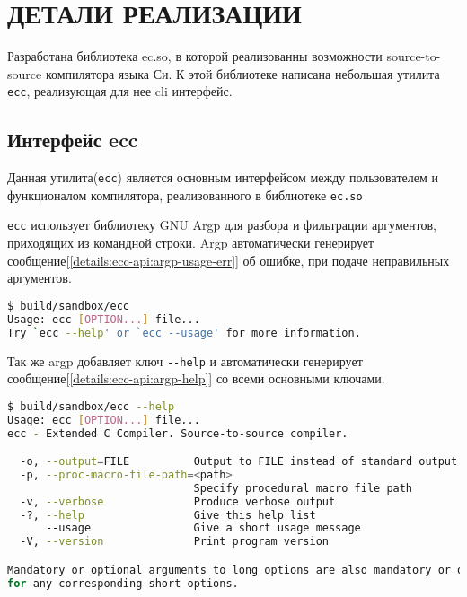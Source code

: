\chapter{ДЕТАЛИ РЕАЛИЗАЦИИ}
\label{ch:ch2}


Разработана библиотека ec.so, в которой реализованны возможности source-to-source компилятора языка Си.
К этой библиотеке написана небольшая утилита \verb|ecc|, реализующая для нее cli интерфейс.

\section{Интерфейс ecc}
\label{details:ecc-cli}
Данная утилита(\verb|ecc|) является основным интерфейсом между пользователем и функционалом компилятора, реализованного в библиотеке \verb|ec.so|

\verb|ecc| использует библиотеку GNU Argp\cite{gnu-argp} для разбора и фильтрации аргументов, приходящих из командной строки. 
Argp автоматически генерирует сообщение[\ref{details:ecc-api:argp-usage-err}] об ошибке, при подаче неправильных аргументов.

\begin{lstlisting}[language=bash, caption={Пример сообщения об ошике, сгенерированного argp}, label={details:ecc-api:argp-usage-err}]
$ build/sandbox/ecc                                   
Usage: ecc [OPTION...] file...
Try `ecc --help' or `ecc --usage' for more information.
\end{lstlisting}

Так же argp добавляет ключ \verb|--help| и автоматически генерирует сообщение[\ref{details:ecc-api:argp-help}] со всеми основными ключами.
\begin{lstlisting}[language=bash, caption={Пример сообщения об использовании, сгенерированного argp}, label={details:ecc-api:argp-help}]
$ build/sandbox/ecc --help
Usage: ecc [OPTION...] file...
ecc - Extended C Compiler. Source-to-source compiler.

  -o, --output=FILE          Output to FILE instead of standard output
  -p, --proc-macro-file-path=<path>
                             Specify procedural macro file path
  -v, --verbose              Produce verbose output
  -?, --help                 Give this help list
      --usage                Give a short usage message
  -V, --version              Print program version

Mandatory or optional arguments to long options are also mandatory or optional
for any corresponding short options.
\end{lstlisting}

